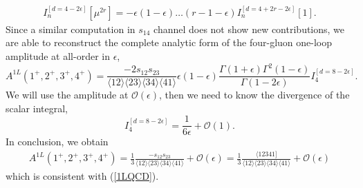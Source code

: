 \begin{align}
	I^{[d=4-2\epsilon]}_n[\mu^{2r}]=-\epsilon(1-\epsilon)\dots (r-1-\epsilon)I_n^{[d=4+2r-2\epsilon]}[1].	\label{dim-shift}
\end{align}
Since a similar computation in $s_{14}$ channel does not show new contributions, we are able to reconstruct the complete analytic form of the four-gluon one-loop amplitude at all-order in $\epsilon$,
$$
	A^{1L}(1^+,2^+,3^+,4^+)=\frac{-2 s_{12}s_{23}}{\langle 12 \rangle \langle 23 \rangle \langle 34 \rangle \langle 41 \rangle} \epsilon(1-\epsilon) \frac{\Gamma(1+\epsilon)\Gamma^2(1-\epsilon)}{\Gamma(1-2\epsilon)} I_4^{[d=8-2\epsilon]}.
$$
We will use the amplitude at $\mathcal{O}(\epsilon)$, then we need to know the divergence of the scalar integral,
$$
	I_4^{[d=8-2\epsilon]}=\frac{1}{6\epsilon} +\mathcal{O}(1).
$$
In conclusion, we obtain
\begin{align}
	A^{1L}(1^+,2^+,3^+,4^+)=\frac{1}{3} \frac{-s_{12}s_{23}}{\langle 12 \rangle \langle 23 \rangle \langle 34 \rangle \langle 41 \rangle}+\mathcal{O}(\epsilon)=\frac{1}{3} \frac{\langle 12341]}{\langle 12 \rangle \langle 23 \rangle \langle 34 \rangle \langle 41 \rangle}+\mathcal{O}(\epsilon)
\end{align}
which is consistent with (\ref{1LQCD}).
